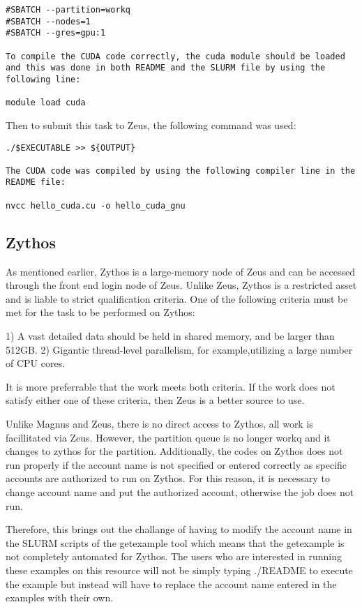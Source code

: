 \documentclass[journal]{IEEEtran}
\begin{document}
\begin{verbatim}
#SBATCH --partition=workq
#SBATCH --nodes=1
#SBATCH --gres=gpu:1

To compile the CUDA code correctly, the cuda module should be loaded and this was done in both README and the SLURM file by using the following line:

module load cuda
\end{verbatim}

Then to submit this task to Zeus, the following command was used:

\begin{verbatim}
./$EXECUTABLE >> ${OUTPUT}

The CUDA code was compiled by using the following compiler line in the README file:

nvcc hello_cuda.cu -o hello_cuda_gnu
\end{verbatim} 
  
\subsection{Zythos}

As mentioned earlier, Zythos is a large-memory node of Zeus and can be accessed through the front end login node of Zeus. Unlike Zeus, Zythos is a 
restricted asset and is liable to strict qualification criteria. One of the following criteria must be met for the task to be performed on Zythos:

1) A vast detailed data should be held in shared memory, and be larger than 512GB.
2) Gigantic thread-level parallelism, for example,utilizing a large number of CPU cores.

It is more preferrable that the work meets both criteria. If the work does not satisfy either one of these criteria, then Zeus is a better source to
use.

Unlike Magnus and Zeus, there is no direct access to Zythos, all work is facillitated via Zeus. However, the partition queue is no longer workq and it
changes to zythos for the partition. Additionally, the codes on Zythos does not run properly if the account name is not specified or entered correctly
as specific accounts are authorized to run on Zythos. For this reason, it is necessary to change account name and put the authorized account, otherwise 
the job does not run.

Therefore, this brings out the challange of having to modify the account name in the SLURM scripts of the getexample tool which means that the
getexample is not completely automated for Zythos. The users who are interested in running these examples on this resource will not be simply typing
./README to execute the example but instead will have to replace the account name entered in the examples with their own.
\end{document}
